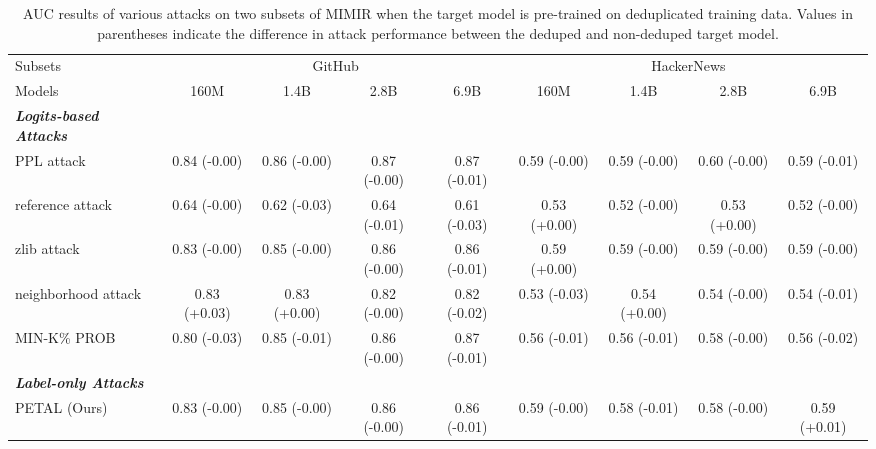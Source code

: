 \begin{table*}[!t]
\centering
\setlength{\tabcolsep}{4.0pt}
\caption{AUC results of various attacks on two subsets of MIMIR when the target model is pre-trained on deduplicated training data. Values in parentheses indicate the difference in attack performance between the deduped and non-deduped target model.}
\scalebox{0.88}
{
\begin{tabular}{l|cccccccc}
\toprule
Subsets & \multicolumn{4}{c}{GitHub}&  \multicolumn{4}{c}{HackerNews}\\
\cmidrule(l{5pt}r{5pt}){2-5}\cmidrule(l{5pt}r{5pt}){6-9}
Models & 160M& 1.4B& 2.8B& 6.9B& 160M& 1.4B& 2.8B& 6.9B\\
\midrule
\textbf{\textit{Logits-based Attacks}}&&&&&&&&\\
PPL attack&0.84 (-0.00)&0.86 (-0.00)&0.87 (-0.00)&0.87 (-0.01)&0.59 (-0.00)&0.59 (-0.00)&0.60 (-0.00)&0.59 (-0.01)\\
reference attack&0.64 (-0.00)&0.62 (-0.03)&0.64 (-0.01)&0.61 (-0.03)&0.53 (+0.00)&0.52 (-0.00)&0.53 (+0.00)&0.52 (-0.00)\\
zlib attack&0.83 (-0.00)&0.85 (-0.00)&0.86 (-0.00)&0.86 (-0.01)&0.59 (+0.00)&0.59 (-0.00)&0.59 (-0.00)&0.59 (-0.00)\\
neighborhood attack&0.83 (+0.03)&0.83 (+0.00)&0.82 (-0.00)&0.82 (-0.02)&0.53 (-0.03)&0.54 (+0.00)&0.54 (-0.00)&0.54 (-0.01)\\
MIN-K\% PROB&0.80 (-0.03)&0.85 (-0.01)&0.86 (-0.00)&0.87 (-0.01)&0.56 (-0.01)&0.56 (-0.01)&0.58 (-0.00)&0.56 (-0.02)\\
\textbf{\textit{Label-only Attacks}}&&&&&&&&\\
PETAL (Ours)&0.83 (-0.00)&0.85 (-0.00)&0.86 (-0.00)&0.86 (-0.01)&0.59 (-0.00)&0.58 (-0.01)&0.58 (-0.00)&0.59 (+0.01)\\
\bottomrule
\end{tabular}
}
\vspace{-0.5em}
\label{table:as_deduplicaion}
\end{table*}